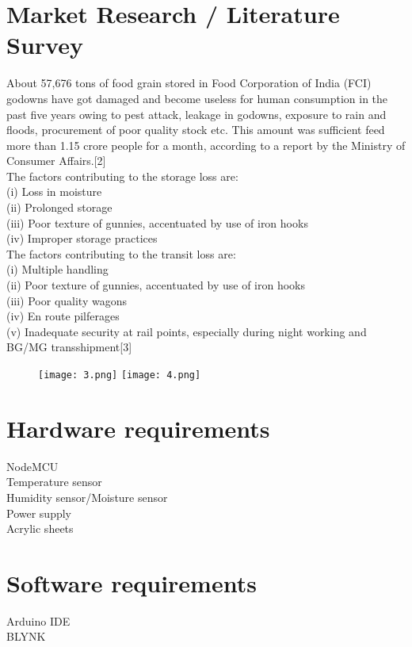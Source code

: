 \documentclass[]{article}
\begin{document}
\section*{Market Research / Literature Survey}
About 57,676 tons of food grain stored in Food Corporation of India (FCI) godowns have got damaged and become useless for human consumption in the past five years owing to pest attack, leakage in godowns, exposure to rain and floods, procurement of poor quality stock etc. This amount was sufficient feed more than 1.15 crore people for a month, according to a report by the Ministry of Consumer Affairs.[2]
\\
The factors contributing to the storage loss are: 
\\
(i) Loss in moisture 
\\
(ii) Prolonged storage
\\
(iii) Poor texture of gunnies, accentuated by use of iron hooks
\\
(iv) Improper storage practices
\\
 The factors contributing to the transit loss are: 
 \\
(i) Multiple handling
\\
(ii) Poor texture of gunnies, accentuated by use of iron hooks 
\\
(iii) Poor quality wagons
\\
(iv) En route pilferages 
\\
(v) Inadequate security at rail points, especially during night working and BG/MG transshipment[3]
\\
\begin{center}
\begin{figure}[!htb]
\texttt{[image: 3.png]}
\texttt{[image: 4.png]}
\end{figure}
\end{center}

\pagebreak
\section*{Hardware requirements}
NodeMCU
\\
Temperature sensor 
\\
Humidity sensor/Moisture sensor 
\\
Power supply
\\
Acrylic sheets


\section*{Software requirements}
Arduino IDE
\\
BLYNK
\\
\\
\end{document}

